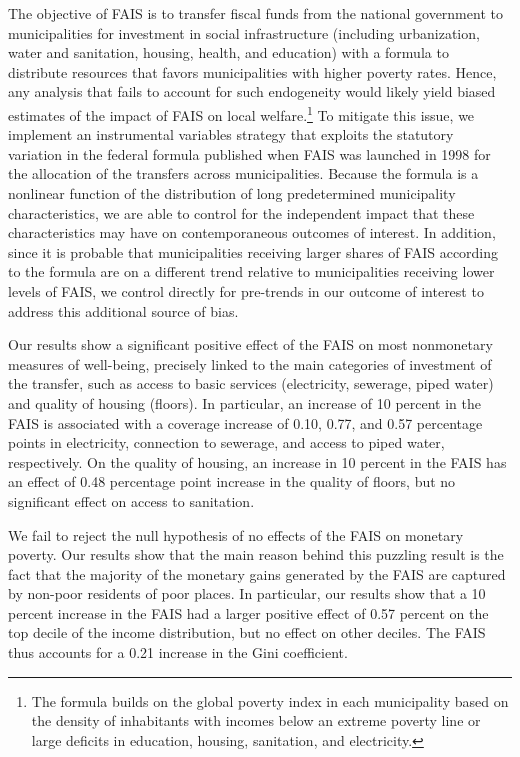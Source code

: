 \documentclass[dv_diss_main.tex]{subfiles}
\begin{document}
The objective of FAIS is to transfer fiscal funds from the national government to municipalities for investment in social infrastructure (including urbanization, water and sanitation, housing, health, and education) with a formula to distribute resources that favors municipalities with higher poverty rates. Hence, any analysis that fails to account for such endogeneity would likely yield biased estimates of the impact of FAIS on local welfare.\footnote{The formula builds on the global poverty index in each municipality based on the density of inhabitants with incomes below an extreme poverty line or large deficits in education, housing, sanitation, and electricity.} To mitigate this issue, we implement an instrumental variables strategy that exploits the statutory variation in the federal formula published when FAIS was launched in 1998 for the allocation of the transfers across municipalities. Because the formula is a nonlinear function of the distribution of long predetermined municipality characteristics, we are able to control for the independent impact that these characteristics may have on contemporaneous outcomes of interest. In addition, since it is probable that municipalities receiving larger shares of FAIS according to the formula are on a different trend relative to municipalities receiving lower levels of  FAIS,   we control directly for pre-trends in our outcome of interest to address this additional source of bias.

Our results show a significant positive effect of the FAIS on most nonmonetary measures of well-being, precisely linked to the main categories of investment of the transfer, such as access to basic services (electricity, sewerage, piped water) and quality of housing (floors). In particular, an increase of 10 percent in the FAIS is associated with a coverage increase of 0.10, 0.77, and 0.57 percentage points in electricity, connection to sewerage, and access to piped water, respectively. On the quality of housing, an increase in 10 percent in the FAIS has an effect of 0.48 percentage point increase in the quality of floors, but no significant effect on access to sanitation.

We fail to reject the null hypothesis of no effects of the FAIS on monetary poverty.  Our results show that the main reason behind this puzzling result is the fact that the majority of the monetary gains generated by the FAIS are captured by non-poor residents of poor places. In particular, our results show that a 10 percent increase in the FAIS had a larger positive effect of 0.57 percent on the top decile of the income distribution, but no effect on other deciles. The FAIS thus accounts for a 0.21 increase in the Gini coefficient.
\end{document}
